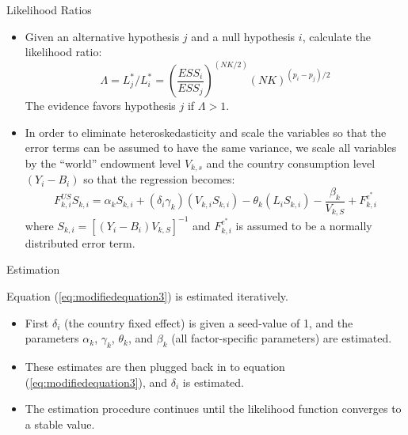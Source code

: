 \documentclass[aspectratio=169]{beamer}
\begin{document}

\begin{frame}{Likelihood Ratios}

\begin{itemize}
    \item<1-> Given an alternative hypothesis $ j $ and a null hypothesis $ i $, calculate the likelihood ratio:
    \begin{equation*}
        \Lambda = L_{j}^{*} / L_{i}^{*} = \left( \frac{ESS_i}{ESS_j} \right)^{\left( NK / 2 \right)}\left( NK \right)^{\left( p_i - p_j \right)/2}
    \end{equation*}
    The evidence favors hypothesis $ j $ if $ \Lambda > 1 $.
    \item<2-> In order to eliminate heteroskedasticity and scale the variables so that the error terms can be assumed to have the same variance, we scale all variables by the “world” endowment level $ V_{k,s} $ and the country consumption level $ \left( Y_i - B_i \right) $ so that the regression becomes:
    \begin{equation}
        F_{k,i}^{US}S_{k,i} = \alpha_{k}S_{k,i} + \left( \delta_{i} \gamma_{k} \right)\left( V_{k,i}S_{k,i} \right) - \theta_{k}\left( L_{i}S_{k,i} \right) - \frac{\beta_{k}}{V_{k,S}} + F_{k,i}^{e^*}
        \label{eq:modifiedequation3}
    \end{equation}
    where $ S_{k,i} = \left[ \left( Y_i - B_i \right) V_{k,S} \right]^{-1} $ and $ F_{k,i}^{e^*} $ is assumed to be a normally distributed error term.
\end{itemize}
    
\end{frame}


\begin{frame}{Estimation}

Equation (\ref{eq:modifiedequation3}) is estimated iteratively.

\begin{itemize}
    \item<1-> First $ \delta_i $ (the country fixed effect) is given a seed-value of 1, and the parameters $ \alpha_k $, $ \gamma_k $, $ \theta_k $, and $ \beta_k $ (all factor-specific parameters) are estimated.
    \item<2-> These estimates are then plugged back in to equation (\ref{eq:modifiedequation3}), and $ \delta_i $ is estimated.
    \item<3-> The estimation procedure continues until the likelihood function converges to a stable value.
\end{itemize}
    
\end{frame}
\end{document}
